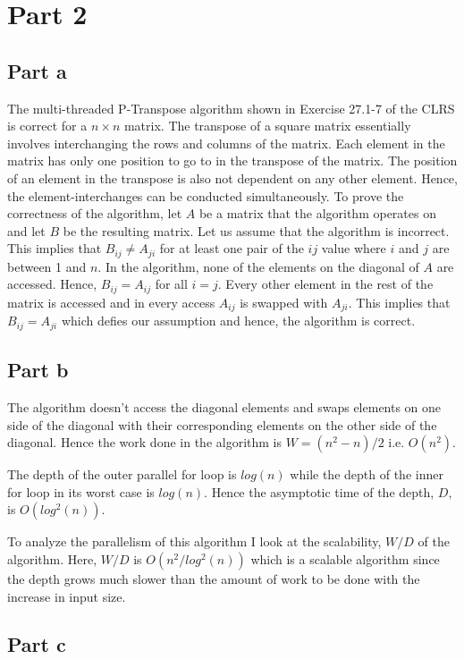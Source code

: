 \section{Part 2}
\label{sec:part2}

\subsection{Part a}

The multi-threaded P-Transpose algorithm shown in Exercise 27.1-7 of the CLRS is correct for a $n \times n$ matrix. The transpose of a square matrix essentially involves interchanging the rows and columns of the matrix. Each element in the matrix has only one position to go to in the transpose of the matrix. The position of an element in the transpose is also not dependent on any other element. Hence, the element-interchanges can be conducted simultaneously. To prove the correctness of the algorithm, let $A$ be a matrix that the algorithm operates on and let $B$ be the resulting matrix. Let us assume that the algorithm is incorrect. This implies that $B_{ij} \neq A_{ji}$ for at least one pair of the $ij$ value where $i$ and $j$ are between 1 and $n$. In the algorithm, none of the elements on the diagonal of $A$ are accessed. Hence, $B_{ij} = A_{ij}$ for all $i = j$. Every other element in the rest of the matrix is accessed and in every access $A_{ij}$ is swapped with $A_{ji}$. This implies that $B_{ij} = A_{ji}$ which defies our assumption and hence, the algorithm is correct.

\subsection{Part b}
The algorithm doesn't access the diagonal elements and swaps elements on one side of the diagonal with their corresponding elements on the other side of the diagonal. Hence the work done in the algorithm is $W = (n^2 - n)/2$ i.e. $O(n^2)$.

The depth of the outer parallel for loop is $log(n)$ while the depth of the inner for loop in its worst case is $log(n)$. Hence the asymptotic time of the depth, $D,$ is $O(log^2(n))$.

To analyze the parallelism of this algorithm I look at the scalability, $W/D$ of the algorithm. Here, $W/D$ is $O(n^2/log^2(n))$ which is a scalable algorithm since the depth grows much slower than the amount of work to be done with the increase in input size.

\subsection{Part c}

